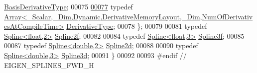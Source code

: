 \begin{DoxyCode}
       \hyperlink{group___splines___module_a507283e4ba6108e20eae19e805816770}{BasisDerivativeType};
00075       
\hyperlink{group___splines___module_a5e0a0e3b07c844c84cf164a7f0db9314}{00077}       \textcolor{keyword}{typedef} 
      \hyperlink{group___core___module_class_eigen_1_1_array}{Array<\_Scalar,\_Dim,Dynamic,DerivativeMemoryLayout,\_Dim,NumOfDerivativesAtCompileTime>}
       \hyperlink{group___splines___module_a5e0a0e3b07c844c84cf164a7f0db9314}{DerivativeType};
00078     \};
00079 
00081     \textcolor{keyword}{typedef} \hyperlink{group___splines___module_class_eigen_1_1_spline}{Spline<float,2>} \hyperlink{namespace_eigen_ab3267f52cedb0db97b9e2900f27193db}{Spline2f};
00082     
00084     \textcolor{keyword}{typedef} \hyperlink{group___splines___module_class_eigen_1_1_spline}{Spline<float,3>} \hyperlink{namespace_eigen_a8df1e9c9ea06a0bcd26626f1b64d785e}{Spline3f};
00085 
00087     \textcolor{keyword}{typedef} \hyperlink{group___splines___module_class_eigen_1_1_spline}{Spline<double,2>} \hyperlink{namespace_eigen_aad3d357fe2fef560e7d8e592fb215fbf}{Spline2d};
00088     
00090     \textcolor{keyword}{typedef} \hyperlink{group___splines___module_class_eigen_1_1_spline}{Spline<double,3>} \hyperlink{namespace_eigen_a652b0c454d2123a13f04922404bed782}{Spline3d};
00091 \}
00092 
00093 \textcolor{preprocessor}{#endif // EIGEN\_SPLINES\_FWD\_H}
\end{DoxyCode}
